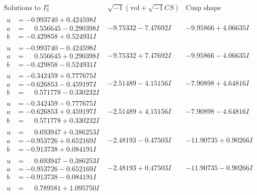 \documentclass[1p]{elsarticle_modified}
\theoremstyle{definition}
\newcommand{\I}{\sqrt{-1}}
\begin{document}
$$\begin{array}{c|c|c}  
\text{Solutions to }I^u_{3}& \I (\text{vol} + \sqrt{-1}CS) & \text{Cusp shape}\\
 \hline 
\begin{aligned}
u &= -0.993740 + 0.424598 I \\
a &= \phantom{-}0.556645 - 0.290398 I \\
b &= -0.429858 + 0.524931 I\end{aligned}
 & -9.75332 - 7.47692 I & -9.95866 + 4.06635 I \\ \hline\begin{aligned}
u &= -0.993740 - 0.424598 I \\
a &= \phantom{-}0.556645 + 0.290398 I \\
b &= -0.429858 - 0.524931 I\end{aligned}
 & -9.75332 + 7.47692 I & -9.95866 - 4.06635 I \\ \hline\begin{aligned}
u &= -0.342459 + 0.777675 I \\
a &= -0.626853 - 0.459197 I \\
b &= \phantom{-}0.571778 - 0.330232 I\end{aligned}
 & -2.51489 - 4.15156 I & -7.90898 + 4.64816 I \\ \hline\begin{aligned}
u &= -0.342459 - 0.777675 I \\
a &= -0.626853 + 0.459197 I \\
b &= \phantom{-}0.571778 + 0.330232 I\end{aligned}
 & -2.51489 + 4.15156 I & -7.90898 - 4.64816 I \\ \hline\begin{aligned}
u &= \phantom{-}0.693947 + 0.386253 I \\
a &= -0.953726 + 0.652169 I \\
b &= -0.913738 + 0.084191 I\end{aligned}
 & -2.48193 - 0.47503 I & -11.90735 + 0.90266 I \\ \hline\begin{aligned}
u &= \phantom{-}0.693947 - 0.386253 I \\
a &= -0.953726 - 0.652169 I \\
b &= -0.913738 - 0.084191 I\end{aligned}
 & -2.48193 + 0.47503 I & -11.90735 - 0.90266 I \\ \hline\begin{aligned}
u &= \phantom{-}0.789581 + 1.095750 I \\

\end{aligned}
\end{array}$$
\end{document}

